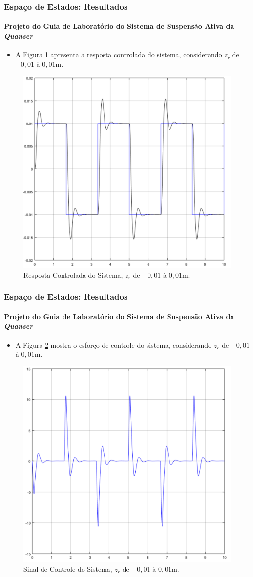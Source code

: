 \documentclass{beamer}
\begin{document}
\begin{frame}
\frametitle{Espaço de Estados: Resultados}
\framesubtitle{Projeto do Guia de Laboratório do Sistema de Suspensão Ativa da \protect\textit{Quanser}}
\begin{itemize}
\item A Figura \ref{quanserE} apresenta a resposta controlada do sistema, considerando $z_r$ de $-0,01$ à $0,01$m.
\end{itemize}
\begin{figure}[H]
	\centering
\includegraphics[width=.45\columnwidth]{./imagens/quanserE.pdf}
    \renewcommand{\figurename}{Fig. 19}
    \caption{Resposta Controlada do Sistema, $z_r$ de $-0,01$ à $0,01$m.}
	\label{quanserE}
\end{figure}
\end{frame}

\begin{frame}
\frametitle{Espaço de Estados: Resultados}
\framesubtitle{Projeto do Guia de Laboratório do Sistema de Suspensão Ativa da \protect\textit{Quanser}}
\begin{itemize}
\item A Figura \ref{quanserE2} mostra o esforço de controle do sistema, considerando $z_r$ de $-0,01$ à $0,01$m.
\end{itemize}
\begin{figure}[H]
	\centering
\includegraphics[width=.45\columnwidth]{./imagens/quanserE2.pdf}
    \renewcommand{\figurename}{Fig. 20}
    \caption{Sinal de Controle do Sistema, $z_r$ de $-0,01$ à $0,01$m.}
	\label{quanserE2}
\end{figure}
\end{frame}
\end{document}
